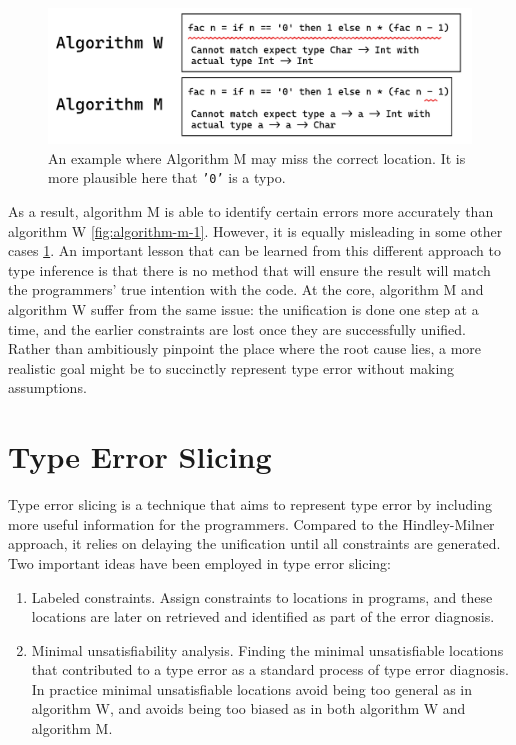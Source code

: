 \begin{figure}[hbt]
  \includegraphics[width=0.8\linewidth]{AlgorithmWM2}
  \caption{
    \label{fig:algorithm-m-2}
    An example where Algorithm M may miss the correct location. It is more plausible here that \texttt{'0'} is a typo.}
\end{figure}


As a result, algorithm M is able to identify certain errors more accurately than algorithm W \ref{fig:algorithm-m-1}. However, it is equally misleading in some other cases \ref{fig:algorithm-m-2}. An important lesson that can be learned from this different approach to type inference is that there is no method that will ensure the result will match the programmers' true intention with the code. At the core, algorithm M and algorithm W suffer from the same issue: the unification is done one step at a time, and the earlier constraints are lost once they are successfully unified. Rather than ambitiously pinpoint the place where the root cause lies, a more realistic goal might be to succinctly represent type error without making assumptions.



\section{Type Error Slicing}

Type error slicing \cite{Tip2001-qn, Haack2004-fr} is a technique that aims to represent type error by including more useful information for the programmers. Compared to the Hindley-Milner approach, it relies on delaying the unification until all constraints are generated. Two important ideas have been employed in type error slicing: 


\begin{enumerate}
  \item {
    Labeled constraints. Assign constraints to locations in programs, and these locations are later on retrieved and identified as part of the error diagnosis. 
  }
  \item {
    Minimal unsatisfiability analysis. Finding the minimal unsatisfiable locations that contributed to a type error  as a standard process of type error diagnosis. In practice minimal unsatisfiable locations avoid being too general as in algorithm W, and avoids being too biased as in both algorithm W and algorithm M. 
  }
\end{enumerate}


